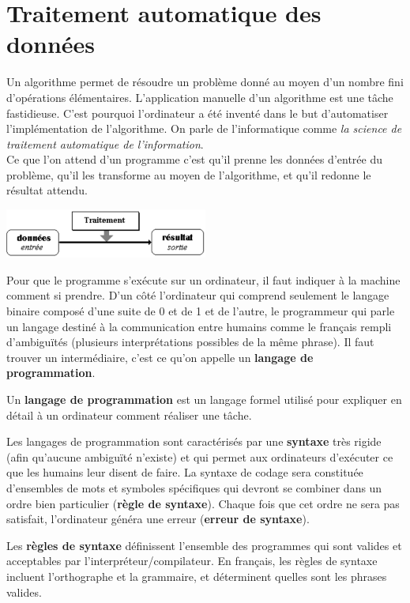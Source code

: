 
\section{Traitement automatique des données}
Un algorithme permet de résoudre un problème donné au moyen d'un nombre fini d'opérations élémentaires. L'application manuelle d'un algorithme est une tâche fastidieuse. C'est pourquoi l'ordinateur a été inventé dans le but d'automatiser l'implémentation de l'algorithme. On parle de l'informatique comme \textit{la science de traitement automatique de l'information}.\\

Ce  que l'on attend d'un programme c'est qu'il prenne les données d'entrée du problème, qu'il les transforme au moyen de l'algorithme, et qu'il redonne le résultat attendu.
\begin{center}
	\includegraphics[trim=0 0 0 20,width=0.5\textwidth]{Images/shema_science_info}
\end{center}
Pour que le programme s'exécute sur un ordinateur, il faut indiquer à la machine comment si prendre. 
D'un côté l'ordinateur qui comprend seulement le langage binaire composé d'une suite de 0 et de 1 et de l'autre, le programmeur qui parle un langage destiné à la communication entre humains comme le français rempli d'ambiguïtés (plusieurs interprétations possibles de la même phrase). Il faut trouver un intermédiaire, c'est ce qu'on appelle un \textbf{langage de programmation}. 
\begin{mydefinition}
	Un \textbf{langage de programmation} est un langage formel utilisé pour expliquer en détail à un ordinateur comment réaliser une tâche.
\end{mydefinition}
Les langages de programmation sont caractérisés par une \textbf{syntaxe} très rigide (afin qu'aucune ambiguïté n'existe) et qui permet aux ordinateurs d'exécuter ce que les humains leur disent de faire. La syntaxe de codage sera constituée d'ensembles de mots et symboles spécifiques qui devront se combiner  dans un ordre bien particulier (\textbf{règle de syntaxe}). Chaque fois que cet ordre ne sera pas satisfait, l'ordinateur généra une erreur (\textbf{erreur de syntaxe}).
\begin{mydefinition}
	Les \textbf{règles de syntaxe} définissent l’ensemble des programmes qui sont valides et acceptables par l’interpréteur/compilateur.
	En français, les règles de syntaxe incluent l’orthographe et la grammaire, et déterminent quelles sont les phrases valides.
\end{mydefinition}

